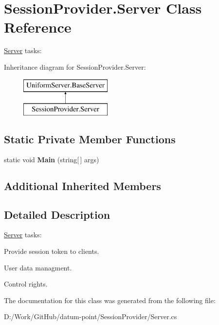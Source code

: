 \hypertarget{class_session_provider_1_1_server}{}\section{Session\+Provider.\+Server Class Reference}
\label{class_session_provider_1_1_server}


\mbox{\hyperlink{class_session_provider_1_1_server}{Server}} tasks\+:  


Inheritance diagram for Session\+Provider.\+Server\+:\begin{figure}[H]
\begin{center}
\leavevmode
\includegraphics[height=2.000000cm]{d8/d17/class_session_provider_1_1_server}
\end{center}
\end{figure}
\subsection*{Static Private Member Functions}
\begin{DoxyCompactItemize}
\item 
\mbox{\label{class_session_provider_1_1_server_a78068e966b78f7579b01ba80f53b87ea}} 
static void {\bfseries Main} (string\mbox{[}$\,$\mbox{]} args)
\end{DoxyCompactItemize}
\subsection*{Additional Inherited Members}


\subsection{Detailed Description}
\mbox{\hyperlink{class_session_provider_1_1_server}{Server}} tasks\+: 


\begin{DoxyItemize}
\item Provide session token to clients.
\item User data managment.
\item Control rights. 
\end{DoxyItemize}

The documentation for this class was generated from the following file\+:\begin{DoxyCompactItemize}
\item 
D\+:/\+Work/\+Git\+Hub/datum-\/point/\+Session\+Provider/Server.\+cs\end{DoxyCompactItemize}
